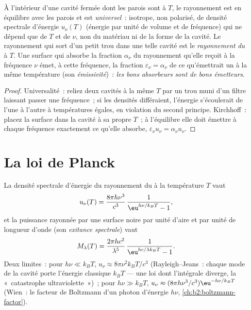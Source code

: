 \begin{proposition}\label{prop:b2:thermal-radiation:kirchhoff}
À l'intérieur d'une cavité fermée dont les parois sont à $T$, le rayonnement est en
équilibre avec les parois et est \emph{universel}~: isotrope,
non polarisé, de densité spectrale d'énergie $u_\nu(T)$ (énergie par unité de
volume et de fréquence) qui ne dépend que de $T$ et de $\nu$, non du
matériau ni de la forme de la cavité. Le rayonnement qui sort d'un petit trou dans
une telle cavité est le \emph{rayonnement du } à $T$. Une surface qui
absorbe la fraction $\alpha_\nu$ du rayonnement qu'elle reçoit à la
fréquence $\nu$ émet, à cette fréquence, la fraction
$\varepsilon_\nu = \alpha_\nu$ de ce qu'émettrait un  à la même
température (son \emph{émissivité})~:
\emph{les bons absorbeurs sont de bons émetteurs}.
\end{proposition}

\begin{proof}
Universalité~: reliez deux cavités à la même $T$ par un trou muni d'un
filtre laissant passer une fréquence~; si les densités différaient, l'énergie
s'écoulerait de l'une à l'autre à températures égales, en violation du second
principe. Kirchhoff~: placez la surface dans la cavité à sa propre $T$~; à
l'équilibre elle doit émettre à chaque fréquence exactement ce qu'elle absorbe,
$\varepsilon_\nu u_\nu = \alpha_\nu u_\nu$.
\end{proof}

\section{La loi de Planck}

\begin{theorem}\label{thm:b2:thermal-radiation:planck}
La densité spectrale d'énergie du rayonnement du  à la température
$T$ vaut
\[
u_\nu(T) = \frac{8\pi h\nu^3}{c^3}\,\frac{1}{\eu^{h\nu/k_BT} - 1},
\]
et la puissance rayonnée par une surface noire par unité d'aire et par unité
de longueur d'onde (son \emph{exitance spectrale}) vaut
\[
M_\lambda(T) = \frac{2\pi hc^2}{\lambda^5}\,\frac{1}{\eu^{hc/\lambda k_BT} - 1}.
\]
Deux limites~: pour $h\nu \ll k_BT$, $u_\nu \approx 8\pi\nu^2 k_BT/c^3$
(Rayleigh--Jeans~: chaque mode de la cavité porte l'énergie classique
$k_BT$ --- une loi dont l'intégrale diverge, la «~catastrophe
ultraviolette~»)~; pour $h\nu \gg k_BT$, $u_\nu \approx (8\pi h\nu^3/c^3)
\eu^{-h\nu/k_BT}$ (Wien~: le facteur de Boltzmann d'un photon d'énergie
$h\nu$, \cref{ch:b2:boltzmann-factor}).
\end{theorem}

